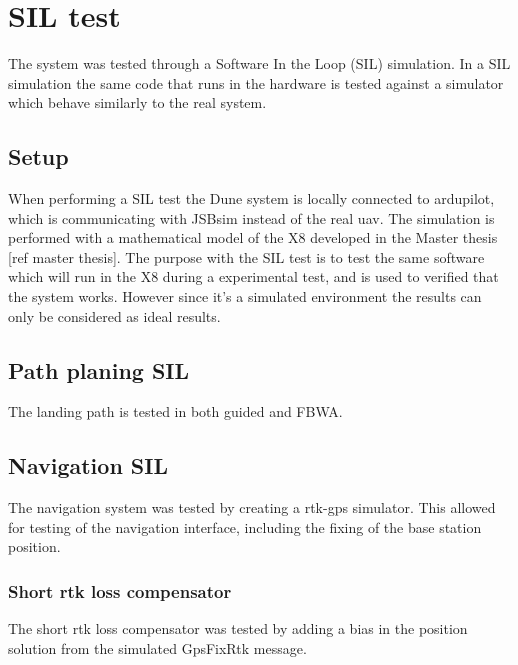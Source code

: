 
\chapter{SIL test}
The system was tested through a Software In the Loop (SIL) simulation. In a SIL simulation the same code that runs in the hardware is tested against a simulator which behave similarly to the real system.
\section{Setup}
When performing a SIL test the Dune system is locally connected to ardupilot, which is communicating with JSBsim instead of the real \gls{uav}. The simulation is performed with a mathematical model of the X8 developed in the Master thesis [ref master thesis]. The purpose with the SIL test is to test the same software which will run in the X8 during a experimental test, and is used to verified that the system works. However since it's a simulated environment the results can only be considered as ideal results.
\section{Path planing SIL}
The landing path is tested in both guided and FBWA. 
\section{Navigation SIL}
The navigation system was tested by creating a \gls{rtk-gps} simulator. This allowed for testing of the navigation interface, including the fixing of the base station position.

\subsection{Short rtk loss compensator}
The short rtk loss compensator was tested by adding a bias in the position solution from the simulated GpsFixRtk message. 
